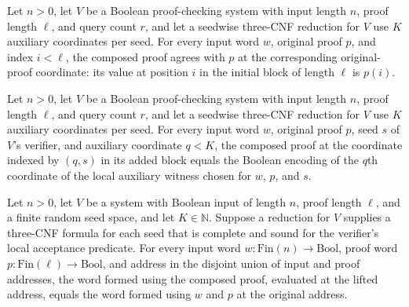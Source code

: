 \begin{theorem}
\label{FABL.composeThreeQueryProof_castAdd}
\leanok
{}
Let $n>0$, let $V$ be a Boolean proof-checking system with input length $n$, proof
length $\ell$, and query count $r$, and let a seedwise three-CNF reduction for $V$ use
$K$ auxiliary coordinates per seed. For every input word $w$, original proof $p$, and
index $i<\ell$, the composed proof agrees with $p$ at the corresponding original-proof
coordinate: its value at position $i$ in the initial block of length $\ell$ is $p(i)$.
\end{theorem}

\begin{theorem}
\label{FABL.composeThreeQueryProof_natAdd}
\leanok
{}
Let $n>0$, let $V$ be a Boolean proof-checking system with input length $n$, proof
length $\ell$, and query count $r$, and let a seedwise three-CNF reduction for $V$ use
$K$ auxiliary coordinates per seed. For every input word $w$, original proof $p$, seed
$s$ of $V$'s verifier, and auxiliary coordinate $q<K$, the composed proof at the
coordinate indexed by $(q,s)$ in its added block equals the Boolean encoding of the
$q$th coordinate of the local auxiliary witness chosen for $w$, $p$, and $s$.
\end{theorem}

\begin{theorem}
\label{FABL.inputProofWord_composeThreeQueryProof_liftOuterAddress}
\leanok
{}
Let $n>0$, let $V$ be a system with Boolean input of length $n$, proof length $\ell$,
and a finite random seed space, and let $K\in\mathbb N$. Suppose a reduction for $V$
supplies a three-CNF formula for each seed that is complete and sound for the verifier's
local acceptance predicate. For every input word
$w\colon\mathrm{Fin}(n)\to\mathrm{Bool}$, proof word
$p\colon\mathrm{Fin}(\ell)\to\mathrm{Bool}$, and address in the disjoint union of input
and proof addresses, the word formed using the composed proof, evaluated at the lifted
address, equals the word formed using $w$ and $p$ at the original address.
\end{theorem}

